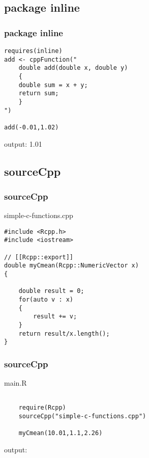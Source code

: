 \documentclass[hyperef={
    colorlinks=true,
    linkcolor=blue,
    filecolor=black,
urlcolor=blue}
]{beamer}
\begin{document}
\subsection{package inline}
\begin{frame}[fragile]
\frametitle{package inline}
\begin{verbatim}
requires(inline)
add <- cppFunction("
    double add(double x, double y)
    {
    double sum = x + y;
    return sum;
    }
")

add(-0.01,1.02)
\end{verbatim}
output:
1.01
\end{frame}

\subsection{sourceCpp}
\begin{frame}[fragile]
\frametitle{sourceCpp}
simple-c-functions.cpp
\begin{verbatim}
#include <Rcpp.h>
#include <iostream>

// [[Rcpp::export]]
double myCmean(Rcpp::NumericVector x)
{
   
    double result = 0;
    for(auto v : x)
    {
        result += v;
    }
    return result/x.length();
}
\end{verbatim}
\end{frame}

\begin{frame}[fragile]
\frametitle{sourceCpp}
main.R
\begin{verbatim}

    require(Rcpp)
    sourceCpp("simple-c-functions.cpp")

    myCmean(10.01,1.1,2.26)
\end{verbatim}
output: 

\end{frame}

\end{document}
